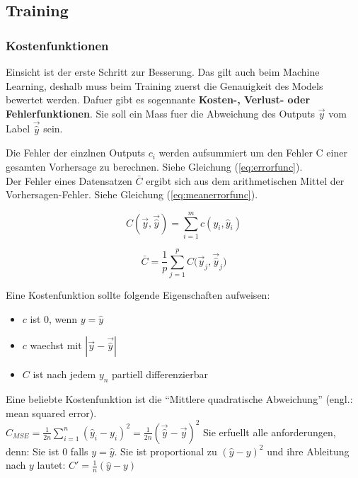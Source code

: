 \documentclass[../main]{subfiles}
\begin{document}
\subsection{Training}
\subsubsection{Kostenfunktionen}
Einsicht ist der erste Schritt zur Besserung. Das gilt auch beim Machine Learning, deshalb muss beim Training zuerst die Genauigkeit des Models bewertet werden.
Dafuer gibt es sogennante \textbf{Kosten-, Verlust- oder Fehlerfunktionen}. Sie soll ein Mass fuer die Abweichung des Outputs $\vec{y}$ vom Label $\vec{\hat{y}}$ sein.
\par\medskip
Die Fehler der einzlnen Outputs $c_i$ werden aufsummiert um den Fehler C einer gesamten Vorhersage zu berechnen. Siehe Gleichung (\ref{eq:errorfunc}).\\
Der Fehler eines Datensatzen $\bar{C}$ ergibt sich aus dem arithmetischen Mittel der Vorhersagen-Fehler. Siehe Gleichung (\ref{eq:meanerrorfunc}).
\par\medskip
\begin{minipage}[h!]{0.5\textwidth}
    \centering
    \begin{equation}\label{eq:errorfunc}
        C(\vec{y},\vec{\hat{y}})=\displaystyle\sum_{i=1}^{m} c(y_i, \hat{y}_i)
    \end{equation}
\end{minipage}
\begin{minipage}[h!]{0.5\textwidth}
    \centering
    \begin{equation}\label{eq:meanerrorfunc}
        \bar{C} = \frac{1}{p}\displaystyle\sum_{j=1}^{p} C\Big(\vec{y}_j,\vec{\hat{y}}_j\Big)
    \end{equation}
\end{minipage}
\par\medskip
Eine Kostenfunktion sollte folgende Eigenschaften aufweisen:
\begin{itemize}
    \item{$c$ ist $0$, wenn $y = \hat{y}$}
    \item{$c$ waechst mit $|\vec{y}-\vec{\hat{y}}|$}
    \item{$C$ ist nach jedem $y_n$ partiell differenzierbar}
\end{itemize}

Eine beliebte Kostenfunktion ist die ``Mittlere quadratische Abweichung'' (engl.: mean squared error).\\
$\displaystyle C_{MSE} = \frac{1}{2n}\sum_{i=1}^{n}(\hat{y}_i - y_i)^2 = \frac{1}{2n}(\vec{\hat{y}} - \vec{y})^2$
Sie erfuellt alle anforderungen, denn:
Sie ist $0$ falls $y=\hat{y}$. Sie ist proportional zu $(\hat{y}-y)^2$ und ihre Ableitung nach $y$ lautet: $C'=\frac{1}{n}(\hat{y}-y)$
\end{document}
